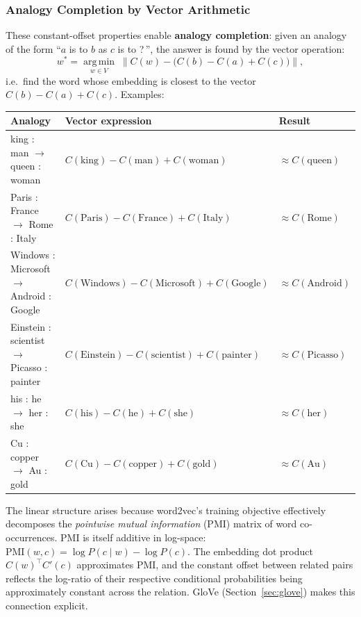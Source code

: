\documentclass[11pt,a4paper]{article}
\begin{document}
\subsubsection{Analogy Completion by Vector Arithmetic}

These constant-offset properties enable \textbf{analogy completion}: given an analogy of the form ``$a$ is to $b$ as $c$ is to ?\,'', the answer is found by the vector operation:
\[
  w^* = \operatorname*{arg\,min}_{w \in V} \;\bigl\| C(w) - \bigl(C(b) - C(a) + C(c)\bigr) \bigr\|,
\]
i.e.\ find the word whose embedding is closest to the vector $C(b) - C(a) + C(c)$. Examples:

\begin{center}
\renewcommand{\arraystretch}{1.3}
\begin{tabular}{lll}
\toprule
\textbf{Analogy} & \textbf{Vector expression} & \textbf{Result} \\
\midrule
king : man $\to$ queen : woman & $C(\text{king}) - C(\text{man}) + C(\text{woman})$ & $\approx C(\text{queen})$ \\
Paris : France $\to$ Rome : Italy & $C(\text{Paris}) - C(\text{France}) + C(\text{Italy})$ & $\approx C(\text{Rome})$ \\
Windows : Microsoft $\to$ Android : Google & $C(\text{Windows}) - C(\text{Microsoft}) + C(\text{Google})$ & $\approx C(\text{Android})$ \\
Einstein : scientist $\to$ Picasso : painter & $C(\text{Einstein}) - C(\text{scientist}) + C(\text{painter})$ & $\approx C(\text{Picasso})$ \\
his : he $\to$ her : she & $C(\text{his}) - C(\text{he}) + C(\text{she})$ & $\approx C(\text{her})$ \\
Cu : copper $\to$ Au : gold & $C(\text{Cu}) - C(\text{copper}) + C(\text{gold})$ & $\approx C(\text{Au})$ \\
\bottomrule
\end{tabular}
\end{center}

\begin{insightbox}
The linear structure arises because word2vec's training objective effectively decomposes the \emph{pointwise mutual information} (PMI) matrix of word co-occurrences. PMI is itself additive in log-space: $\text{PMI}(w, c) = \log P(c \mid w) - \log P(c)$. The embedding dot product $C(w)^\top C'(c)$ approximates PMI, and the constant offset between related pairs reflects the log-ratio of their respective conditional probabilities being approximately constant across the relation. GloVe (Section~\ref{sec:glove}) makes this connection explicit.
\end{insightbox}
\end{document}
